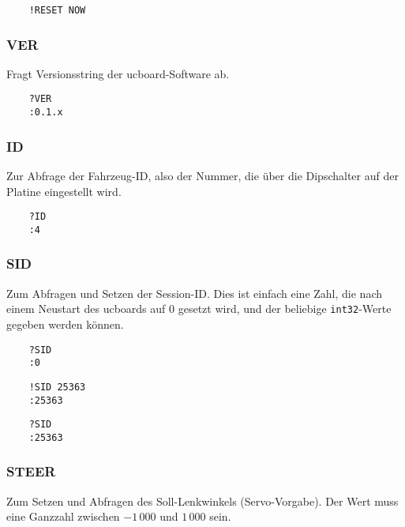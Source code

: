 \begin{verbatim}
	!RESET NOW
\end{verbatim}



\subsubsection{VER}

Fragt Versionsstring der ucboard-Software ab.


\begin{verbatim}
	?VER
	:0.1.x
\end{verbatim}



\subsubsection{ID}

Zur Abfrage der Fahrzeug-ID, also der Nummer, die über die Dipschalter auf der Platine eingestellt wird.


\begin{verbatim}
	?ID
	:4
\end{verbatim}


\subsubsection{SID}

Zum Abfragen und Setzen der Session-ID. Dies ist einfach eine Zahl, die nach einem Neustart des ucboards auf 0 gesetzt wird, und der beliebige \verb|int32|-Werte gegeben werden können.


\begin{verbatim}
	?SID
	:0
\end{verbatim}

\begin{verbatim}
	!SID 25363
	:25363
\end{verbatim}

\begin{verbatim}
	?SID
	:25363
\end{verbatim}




\subsubsection{STEER}

Zum Setzen und Abfragen des Soll-Lenkwinkels (Servo-Vorgabe). Der Wert muss eine Ganzzahl zwischen $-1\,000$ und $1\,000$ sein.

